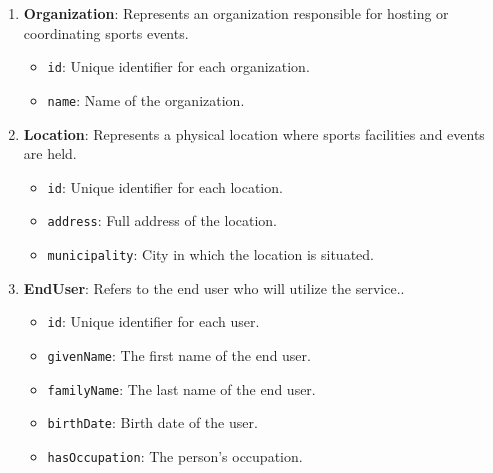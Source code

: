 \begin{enumerate}
    \item \textbf{Organization}: Represents an organization responsible for hosting or coordinating sports events.
    \begin{itemize}
        \item \texttt{id}: Unique identifier for each organization.
        \item \texttt{name}: Name of the organization.
    \end{itemize}

    \item \textbf{Location}: Represents a physical location where sports facilities and events are held.
    \begin{itemize}
        \item \texttt{id}: Unique identifier for each location.
        \item \texttt{address}: Full address of the location.
        \item \texttt{municipality}: City in which the location is situated.
    \end{itemize}

    \item \textbf{EndUser}: Refers to the end user who will utilize the service..
    \begin{itemize}
        \item \texttt{id}: Unique identifier for each user.
        \item \texttt{givenName}: The first name of the end user.
        \item \texttt{familyName}: The last name of the end user.
        \item \texttt{birthDate}: Birth date of the user.
        \item \texttt{hasOccupation}: The person's occupation.
    \end{itemize}
\end{enumerate}

